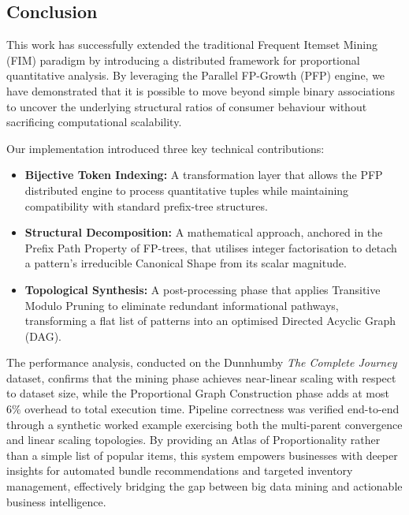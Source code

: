 \documentclass[10pt, twocolumn]{article}
\begin{document}
\subsection{Conclusion}

This work has successfully extended the traditional Frequent Itemset Mining
(FIM) paradigm by introducing a distributed framework for proportional
quantitative analysis. By leveraging the Parallel FP-Growth (PFP) engine, we
have demonstrated that it is possible to move beyond simple binary associations
to uncover the underlying structural ratios of consumer behaviour without
sacrificing computational scalability.

Our implementation introduced three key technical contributions:

\begin{itemize}
    \item \textbf{Bijective Token Indexing:} A transformation layer that allows
          the PFP distributed engine to process quantitative tuples while maintaining
          compatibility with standard prefix-tree structures.

    \item \textbf{Structural Decomposition:} A mathematical approach, anchored
          in the Prefix Path Property of FP-trees, that utilises integer factorisation to
          detach a pattern's irreducible Canonical Shape from its scalar magnitude.

    \item \textbf{Topological Synthesis:} A post-processing phase that applies
          Transitive Modulo Pruning to eliminate redundant informational pathways,
          transforming a flat list of patterns into an optimised Directed Acyclic Graph
          (DAG).
\end{itemize}

The performance analysis, conducted on the Dunnhumby \textit{The Complete
Journey} dataset, confirms that the mining phase achieves near-linear scaling
with respect to dataset size, while the Proportional Graph Construction phase
adds at most $6\%$ overhead to total execution time. Pipeline correctness was
verified end-to-end through a synthetic worked example exercising both the
multi-parent convergence and linear scaling topologies. By providing an Atlas
of Proportionality rather than a simple list of popular items, this system
empowers businesses with deeper insights for automated bundle recommendations
and targeted inventory management, effectively bridging the gap between big
data mining and actionable business intelligence.
\end{document}
